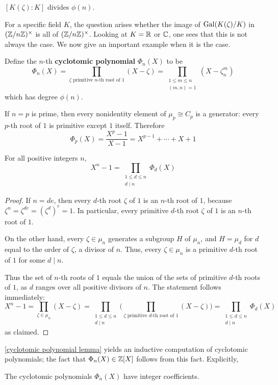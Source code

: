$[K(\zeta):K]$ divides $\phi(n)$.\par
For a specific field $K$, the question arises whether the image of $\mathrm{Gal}(K(\zeta)/K)$ in $(\mathbb{Z}/n\mathbb{Z})^\times$ is all of $(\mathbb{Z}/n\mathbb{Z})^\times$. Looking at $K=\mathbb{R}$ or $\mathbb{C}$, one sees that this is not always the case. We now give an important example when it is the case.\par
Define the $n$-th \textbf{cyclotomic polynomial} $\Phi_n(X)$ to be
\[\Phi_n(X)=\prod_{\zeta\text{ primitive $n$-th root of }1}(X-\zeta)=\prod_{\substack{1\leq m\leq n\\(m,n)=1}}(X-\zeta_n^m)\]
which has degree $\phi(n)$.
\begin{example}
If $n=p$ is prime, then every nonidentity element of $\mu_p\cong C_p$ is a generator: every $p$-th root of $1$ is primitive except $1$ itself. Therefore
\[\Phi_p(X)=\dfrac{X^p-1}{X-1}=X^{p-1}+\cdots+X+1\]
\end{example}
\begin{lemma}\label{cyclotomic polynomial lemma}
For all positive integers $n$,
\[X^n-1=\prod_{\substack{1\leq d\leq n\\d\mid n}}\Phi_d(X)\]
\end{lemma}
\begin{proof}
If $n=de$, then every $d$-th root $\zeta$ of $1$ is an $n$-th root of $1$, because $\zeta^n=\zeta^{de}=(\zeta^d)^e=1$. In particular, every primitive $d$-th root $\zeta$ of $1$ is an $n$-th root of $1$.\par
On the other hand, every $\zeta\in \mu_n$ generates a subgroup $H$ of $\mu_n$, and $H=\mu_d$ for
$d$ equal to the order of $\zeta$, a divisor of $n$. Thus, every $\zeta\in \mu_n$ is a primitive $d$-th root of $1$ for some $d\mid n$.\par
Thus the set of $n$-th roots of $1$ equals the union of the sets of primitive $d$-th roots of $1$, as $d$ ranges over all positive divisors of $n$. The statement follows immediately:
\[X^n-1=\prod_{\zeta\in \mu_n}(X-\zeta)=\prod_{\substack{1\leq d\leq n\\d\mid n}}\Bigg(\prod_{\zeta\text{ primitive $d$-th root of }1}(X-\zeta)\Bigg)=\prod_{\substack{1\leq d\leq n\\d\mid n}}\Phi_d(X)\]
as claimed.
\end{proof}
\cref{cyclotomic polynomial lemma} yields an inductive computation of cyclotomic polynomials; the fact that $\Phi_n(X)\in\mathbb{Z}[X]$ follows from this fact. Explicitly,
\begin{corollary}
The cyclotomic polynomials $\Phi_n(X)$ have integer coefficients.
\end{corollary}
